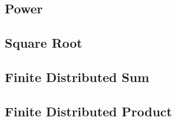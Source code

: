 \documentclass[12pt]{article}
\begin{document}
\subsection{Power}
\label{sec:power}


\subsection{Square Root}
\label{sec:square-root}

\subsection{Finite Distributed Sum}
\label{sec:fin-distr-sum}

\subsection{Finite Distributed Product}
\label{sec:fin-distr-product}



% 
\printbibliography{}

\end{document}
